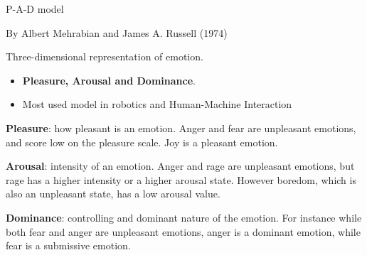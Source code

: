 \documentclass[compress]{beamer}
\begin{document}
\begin{frame}{P-A-D model}

By Albert Mehrabian and James A. Russell (1974)

Three-dimensional representation of emotion.

\begin{itemize}

\item \textbf{Pleasure, Arousal and Dominance}.
\item Most used model in robotics and Human-Machine Interaction
\end{itemize}

\pause

\textbf{Pleasure}: how pleasant is an emotion. Anger and fear are
unpleasant emotions, and score low on the pleasure scale. Joy is a
pleasant emotion.

\pause

\textbf{Arousal}: intensity of an emotion. Anger and rage are unpleasant
emotions, but rage has a higher intensity or a higher arousal state.
However boredom, which is also an unpleasant state, has a low arousal
value.

\pause

\textbf{Dominance}: controlling and dominant nature of the emotion. For
instance while both fear and anger are unpleasant emotions, anger is a
dominant emotion, while fear is a submissive emotion.

\end{frame}
\end{document}
